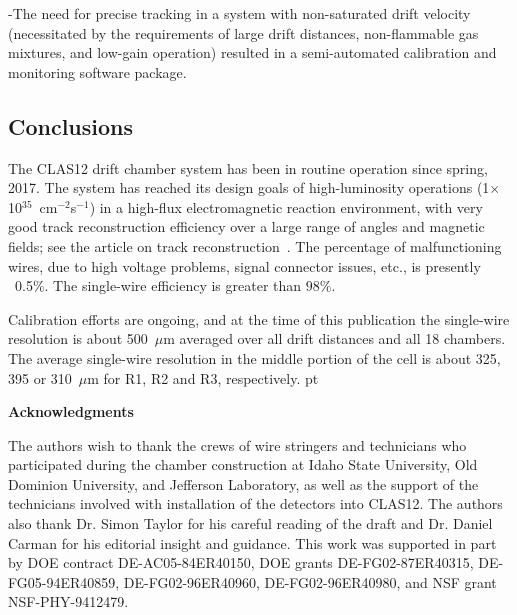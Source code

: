\noindent
-The need for precise tracking in a system with non-saturated drift velocity 
(necessitated by the requirements of large drift distances, non-flammable gas mixtures, 
and low-gain operation) resulted in a semi-automated calibration and monitoring software 
package.

\vskip 10pt
\subsection{Conclusions}
The CLAS12 drift chamber system has been in routine operation since spring, 2017. 
The system has reached its design goals of high-luminosity operations
(1$\times$10$^{35}$~cm$^{-2}$s$^{-1}$) in a high-flux electromagnetic reaction
environment, with very good track reconstruction efficiency over a large range of angles and 
magnetic fields; see the article on track reconstruction~\cite{recon-nim}.  
The percentage of malfunctioning wires, due to high voltage problems, signal
connector issues, etc., is presently ~0.5\%.
The single-wire efficiency is greater than $98\%$.

Calibration efforts are ongoing, and at the time of this publication the
single-wire resolution is about 500~$\mu$m averaged over all drift distances and
all 18 chambers.  The average single-wire resolution in the middle 
portion of the cell is about 325, 395 or 310~$\mu$m for R1, R2 and R3, respectively.
 pt

{\large{\bf Acknowledgments}}

\vskip 10pt

The authors wish to thank the crews of wire stringers and technicians who 
participated during the chamber construction at Idaho State University,
Old Dominion University, and Jefferson Laboratory, as well as the support of 
the technicians involved with installation of the detectors into CLAS12.  The
authors also thank Dr. Simon Taylor for his careful reading of the draft
and Dr. Daniel Carman for his editorial insight and guidance.  This
work was supported in part by DOE contract DE-AC05-84ER40150, DOE grants 
DE-FG02-87ER40315, DE-FG05-94ER40859, DE-FG02-96ER40960, DE-FG02-96ER40980, 
and NSF grant NSF-PHY-9412479.




